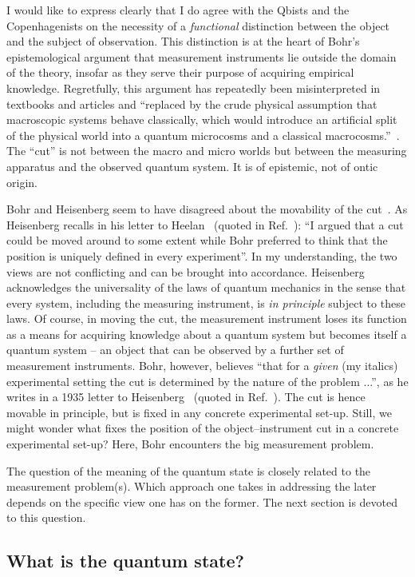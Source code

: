 \documentclass[12pt,a4]{article}
\begin{document}
I would like to express clearly that I do agree with the Qbists and the Copenhagenists on the necessity of a {\it functional} distinction between the object and the subject of observation. This distinction is at the heart of Bohr's epistemological argument that measurement instruments lie outside the domain of the theory, insofar as they serve their purpose of acquiring empirical knowledge. Regretfully, this argument has repeatedly been misinterpreted in textbooks and articles and ``replaced by the crude physical assumption that macroscopic systems behave classically, which would introduce an artificial split of the physical world into a quantum microcosms and a classical macrocosms.''~\cite{osnaghi}. The ``cut'' is not between the macro and micro worlds but between the measuring apparatus and the observed quantum system. It is of epistemic, not of ontic origin. 

Bohr and Heisenberg seem to have disagreed about the movability of the cut~\cite{max}. As Heisenberg recalls in his letter to Heelan~\cite{heelan} (quoted in Ref.~\cite{max}): ``I argued that a cut could be moved around to some extent while Bohr preferred to think that the position is uniquely defined in every experiment''. In my understanding, the two views are not conflicting and can be brought into accordance. Heisenberg acknowledges the universality of the laws of quantum mechanics in the sense that every system, including the measuring instrument, is {\it in principle} subject to these laws. Of course, in moving the cut, the measurement instrument loses its function as a means for acquiring knowledge about a quantum system but becomes itself a quantum system -- an object that can be observed by a further set of measurement instruments. Bohr, however, believes ``that for a {\it given} (my italics) experimental setting the cut is determined by the nature of the problem ...'', as he writes in a 1935 letter to Heisenberg~\cite{AHQP} (quoted in Ref.~\cite{max}). The cut is hence movable in principle, but is fixed in any concrete experimental set-up. Still, we might wonder what fixes the position of the object--instrument cut in a concrete experimental set-up? Here, Bohr encounters the big measurement problem. 

The question of the meaning of the quantum state is closely related to the measurement problem(s). Which approach one takes in addressing the later depends on the specific view one has on the former. The next section is devoted to this question. 

\subsection*{What is the quantum state?}
\end{document}
